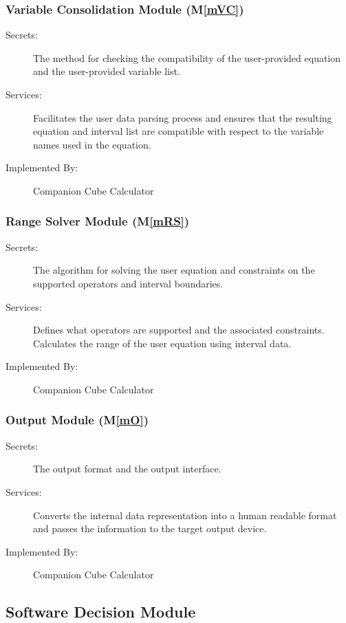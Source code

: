 \documentclass[12pt, titlepage]{article}
\newcommand{\mref}[1]{M\ref{#1}}
\newcommand{\progname}{Companion Cube Calculator} %
\begin{document}
\subsubsection{Variable Consolidation Module (\mref{mVC})}

\begin{description}
	\item[Secrets:] The method for checking the compatibility of the 
	user-provided equation and the user-provided variable list.
	\item[Services:] Facilitates the user data parsing process and ensures that 
	the resulting equation and interval list are compatible with respect to the 
	variable names used in the equation.
	\item[Implemented By:] \progname{}
\end{description}

\subsubsection{Range Solver Module (\mref{mRS})}

\begin{description}
	\item[Secrets:]The algorithm for solving the user equation and constraints 
	on the supported operators and interval boundaries.
	\item[Services:]Defines what operators are supported and the associated 
	constraints. Calculates the range of the user equation using interval data.
	\item[Implemented By:] \progname{}
\end{description}

\subsubsection{Output Module (\mref{mO})}

\begin{description}
	\item[Secrets:]The output format and the output interface.
	\item[Services:]Converts the internal data representation into a human 
	readable format and passes the information to the target output device.
	\item[Implemented By:] \progname{}
\end{description}


\subsection{Software Decision Module}
\end{document}
